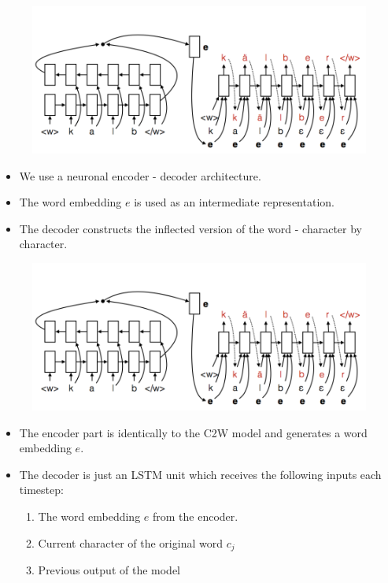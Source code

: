 \documentclass[11pt, a4paper, landscape]{article}
\begin{document}
\begin{figure}[H]
\begin{center}
  \includegraphics[width=.6\linewidth]{../article/img/inflection-generation}
\end{center}
\end{figure}
\begin{itemize}
\item We use a neuronal encoder - decoder architecture.
\item The word embedding $e$ is used as an intermediate representation.
\item The decoder constructs the inflected version of the word - character by character.
\end{itemize}


\NewPage{}

\begin{figure}[H]
\begin{center}
  \includegraphics[width=.6\linewidth]{../article/img/inflection-generation}
\end{center}
\end{figure}
\begin{itemize}
\item The encoder part is identically to the C2W model and generates a word embedding $e$.
\item The decoder is just an LSTM unit which receives the following inputs each timestep:
  \begin{enumerate}
    \item The word embedding $e$ from the encoder.
    \item Current character of the original word $c_j$
    \item Previous output of the model
  \end{enumerate}
\end{itemize}
\end{document}
